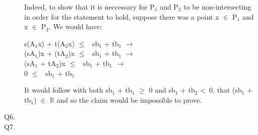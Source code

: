 \documentclass[10pt]{csc_assignment}
\begin{document}
\begin{description}
Indeed, to show that it is neccessary for P$_{1}$ and P$_{2}$ to be non-intersecting in order for the statement to hold, suppose there was a point x $\in$ P$_{1}$ and x $\in$ P$_{2}$. We would have:\\   
\hspace*{1cm}\parbox{16cm}{s(A$_{1}$x) + t(A$_{2}$x) $\leqslant$ ~sb$_{1}$ + tb$_{1}$ $\rightarrow$\\
(sA$_{1}$)x + (tA$_{2}$)x $\leqslant$ ~sb$_{1}$ + tb$_{1}$ $\rightarrow$\\
(sA$_{1}$ + tA$_{2}$)x $\leqslant$ ~sb$_{1}$ + tb$_{1}$ $\rightarrow$\\
0 $\leqslant$ ~sb$_{1}$ + tb$_{1}$\\
}
It would follow with both sb$_{1}$ + tb$_{1}$ $\geqslant$ 0 and sb$_{1}$ + tb$_{2}$ \textless ~0, that (sb$_{1}$ + tb$_{1}$) $\in$ $\mathbb{R}$ and so the claim would be impossible to prove.


\newpage
\item[Q6.]



\newpage
\item[Q7.]


\end{description}
\end{document}
